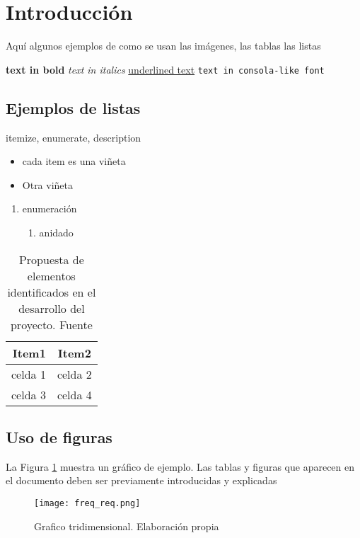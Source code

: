 \section{Introducción}

Aquí algunos ejemplos de como se usan las imágenes, las tablas las listas

\textbf{ text in bold}
\textit{text in italics}
\underline{underlined text}
\texttt{text in consola-like font}

\subsection*{Ejemplos de listas}
itemize, enumerate, description

\begin{itemize}
    \item cada item es una viñeta
    \item Otra viñeta
\end{itemize}

\begin{enumerate}
    \item enumeración
    \begin{enumerate}
        \item anidado
    \end{enumerate}
\end{enumerate}

\begin{figure*}[htb]
\centering
{}

\label{fig:examples}
\end{figure*}
 
 \begin{table}[htb]
     \centering
     \begin{tabular}{rc}
	\toprule
    	Item1 & Item2  \\
	\midrule
	celda 1 & celda 2\\
 celda 3 & celda 4\\
	\bottomrule

\end{tabular}
     \caption{Propuesta de elementos identificados en el desarrollo del proyecto. Fuente \citep{Hinton2012}}
     \label{tab:my_label}
 \end{table}

\subsection*{Uso de figuras}
La Figura \ref{fig:figure1} muestra un gráfico de ejemplo. Las tablas y figuras que aparecen en el documento deben ser previamente introducidas y explicadas 


\begin{figure}
\centering
\texttt{[image: freq\_req.png]}
\caption{Grafico tridimensional. Elaboración propia}
\label{fig:figure1}
\end{figure}